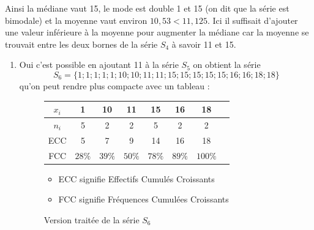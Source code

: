 \documentclass[11pt]{article}
\begin{document}
Ainsi la médiane vaut 15, le mode est double 1 et 15 (on dit
que la série est bimodale) et la moyenne vaut environ \(10,53 <
	11,125\). Ici il suffisait d'ajouter une valeur inférieure à la
moyenne pour augmenter la médiane car la moyenne se trouvait
entre les deux bornes de la série \(S_4\) à savoir 11 et 15.
\begin{enumerate}
\item Oui c'est possible en ajoutant 11 à la série \(S_5\) on obtient la
série \[S_6 = \{1 ; 1 ; 1 ; 1 ; 1 ; 10 ; 10 ; 11 ; 11 ; 15 ; 15 ;
   15 ; 15 ; 15 ; 16 ; 16 ; 18 ; 18\}\] qu'on peut rendre plus
compacte avec un tableau :

\begin{center}
	\begin{figure}[H]
	\caption{Version traitée de la série $S_6$}
	\centering
	\vspace{.5cm}
	\begin{tabular}{*{8}{|c}|}
		\hline
		$x_i$ & 1 & 10 & 11 & 15 & 16 & 18 \\
		\hline
		$n_i$ & 5 & 2 & 2 & 5 & 2 & 2 \\
		\hline
		ECC & 5 & 7 & 9 & 14 & 16 & 18\\
		\hline
		FCC & $28\%$ & $39\%$ & $50\%$ & $78\%$ & $89\%$ & $100\%$  \\
		\hline
	\end{tabular}
		\vspace{.5cm}
		\begin{itemize}
			\item ECC signifie Effectifs Cumulés Croissants
			\item FCC signifie Fréquences Cumulées Croissants
		\end{itemize}
	\end{figure}
\end{center}
\end{enumerate}
\end{document}
